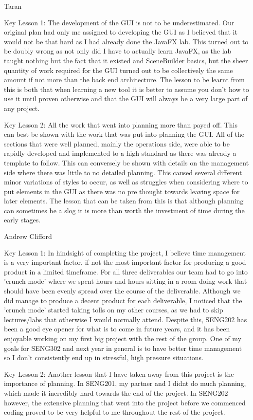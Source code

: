 Taran

Key Lesson 1:
The development of the GUI is not to be underestimated. Our original plan had only me assigned to developing the GUI as I believed that it would not be that hard as I had already done the JavaFX lab. This turned out to be doubly wrong as not only did I have to actually learn JavaFX, as the lab taught nothing but the fact that it existed and SceneBuilder basics, but the sheer quantity of work required for the GUI turned out to be collectively the same amount if not more than the back end architecture.
The lesson to be learnt from this is both that when learning a new tool it is better to assume you don't how to use it until proven otherwise and that the GUI will always be a very large part of any project.

Key Lesson 2:
All the work that went into planning more than payed off. This can best be shown with the work that was put into planning the GUI. All of the sections that were well planned, mainly the operations side, were able to be rapidly developed and implemented to a high standard as there was already a template to follow. This can conversely be shown with details on the management side where there was little to no detailed planning. This caused several different minor variations of styles to occur, as well as struggles when considering where to put elements in the GUI as there was no pre thought towards leaving space for later elements.
The lesson that can be taken from this is that although planning can sometimes be a slog it is  more than worth the investment of time during the early stages.

Andrew Clifford

Key Lesson 1:
In hindsight of completing the project, I believe time management is a very important factor, if not the most important factor for producing a good product in a limited timeframe. For all three deliverables our team had to go into 'crunch mode' where we spent hours and hours sitting in a room doing work that should have been evenly spread over the course of the deliverable. Although we did manage to produce a decent product for each deliverable, I noticed that the 'crunch mode' started taking tolls on my other courses, as we had to skip lectures/labs that otherwise I would normally attend. Despite this, SENG202 has been a good eye opener for what is to come in future years, and it has been enjoyable working on my first big project with the rest of the group. One of my goals for SENG302 and next year in general is to have better time management so I don't consistently end up in stressful, high pressure situations.

Key Lesson 2:
Another lesson that I have taken away from this project is the importance of planning. In SENG201, my partner and I didnt do much planning, which made it incredibly hard towards the end of the project. In SENG202 however, the extensive planning that went into the project before we commenced coding proved to be very helpful to me throughout the rest of the project.